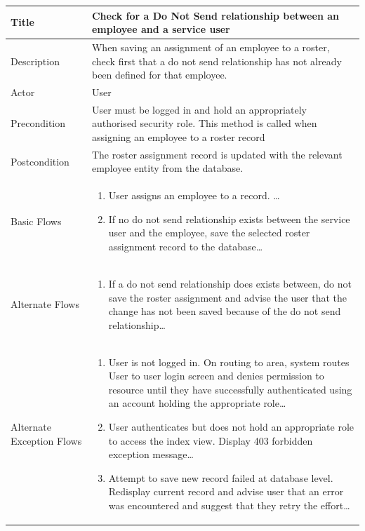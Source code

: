 \documentclass[a4paper,Times New Roman 11pt]{article}
\newcommand\addrow[2]{#1 &#2\\ }
\newcommand\addheading[2]{#1 &#2\\ \hline}
\newcommand\tabularhead{\begin{tabular}{lp{9cm}}
\hline
}
\newcommand\addmulrow[2]{ \begin{minipage}[t][][t]{3cm}#1\end{minipage}%
   &\begin{minipage}[t][][t]{9cm}
    \begin{enumerate} #2   \end{enumerate}
    \end{minipage}\\ }
\newenvironment{usecase}{\tabularhead}
{\hline\end{tabular}}
\begin{document}
\begin{samepage}
\begin{usecase}
    \addheading{Title}{Check for a Do Not Send relationship between an employee and a service user}
  \addheading{Description}{When saving an assignment of an employee to a roster, check first that a do not send relationship has not already been defined for that employee.}
  \addheading{Actor}{User} 
  \addrow{Precondition}{User must be logged in and hold an appropriately authorised security role. This method is called when assigning an employee to a roster record}
  \addrow{Postcondition}{The roster assignment record is updated with the relevant employee entity from the database.}
  \addmulrow{Basic Flows}{\item User assigns an employee to a record. \ldots
  \item If no do not send relationship exists between the service user and the employee, save the selected roster assignment record to the database\ldots}
  \addmulrow{Alternate  Flows}{\item If a do not send relationship does exists between, do not save the roster assignment and advise the user that the change has not been saved because of the do not send relationship\ldots}
  \addmulrow{Alternate Exception Flows}{\item User is not logged in. On routing to area, system routes User to user login screen and denies permission to resource until they have successfully authenticated using an account holding the appropriate role\ldots
                                                                      \item User authenticates but does not hold an appropriate role to access the index view. Display 403 forbidden exception message\ldots
                                                                      \item Attempt to save new record failed at database level. Redisplay current record and advise user that an error was encountered and suggest that they retry the effort\ldots}

\end{usecase}


\end{samepage}
\end{document}
